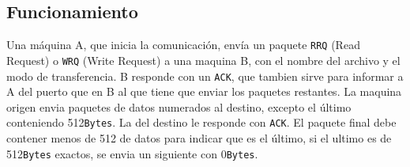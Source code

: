 \subsection*{Funcionamiento}
Una máquina A, que inicia la comunicación, envía un paquete \texttt{RRQ} (Read Request) o \texttt{WRQ} (Write Request) a una maquina B, con el nombre del archivo y el modo de transferencia. B responde con un \texttt{ACK}, que  tambien sirve para informar a A del puerto que en B al que tiene que enviar los paquetes restantes. La maquina origen envia paquetes de datos numerados al destino, excepto el último conteniendo 512\texttt{Bytes}. La del destino le responde con \texttt{ACK}. El paquete final debe contener menos de 512 de datos para indicar que es el último, si el ultimo es de 512\texttt{Bytes} exactos, se envia un siguiente con 0\texttt{Bytes}.


